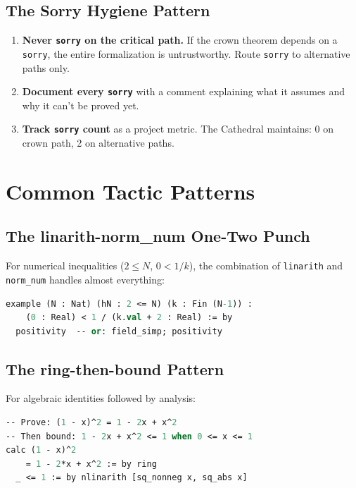\documentclass[11pt,a4paper]{article}
\newcommand{\lean}[1]{\texttt{#1}}
\begin{document}
\subsection{The Sorry Hygiene Pattern}

\begin{enumerate}
  \item \textbf{Never \lean{sorry} on the critical path.} If the
    crown theorem depends on a \lean{sorry}, the entire formalization
    is untrustworthy. Route \lean{sorry} to alternative paths only.
  \item \textbf{Document every \lean{sorry}} with a comment explaining
    what it assumes and why it can't be proved yet.
  \item \textbf{Track \lean{sorry} count} as a project metric.
    The Cathedral maintains: 0 on crown path, 2 on alternative paths.
\end{enumerate}

\section{Common Tactic Patterns}
\label{sec:tactics}

\subsection{The linarith-norm\_num One-Two Punch}

For numerical inequalities ($2 \leq N$, $0 < 1/k$), the combination
of \lean{linarith} and \lean{norm\_num} handles almost everything:

\begin{lstlisting}[language=ML,caption={Numerical inequality dispatch}]
example (N : Nat) (hN : 2 <= N) (k : Fin (N-1)) :
    (0 : Real) < 1 / (k.val + 2 : Real) := by
  positivity  -- or: field_simp; positivity
\end{lstlisting}

\subsection{The ring-then-bound Pattern}

For algebraic identities followed by analysis:

\begin{lstlisting}[language=ML,caption={Algebra then analysis}]
-- Prove: (1 - x)^2 = 1 - 2x + x^2
-- Then bound: 1 - 2x + x^2 <= 1 when 0 <= x <= 1
calc (1 - x)^2
    = 1 - 2*x + x^2 := by ring
  _ <= 1 := by nlinarith [sq_nonneg x, sq_abs x]
\end{lstlisting}
\end{document}
